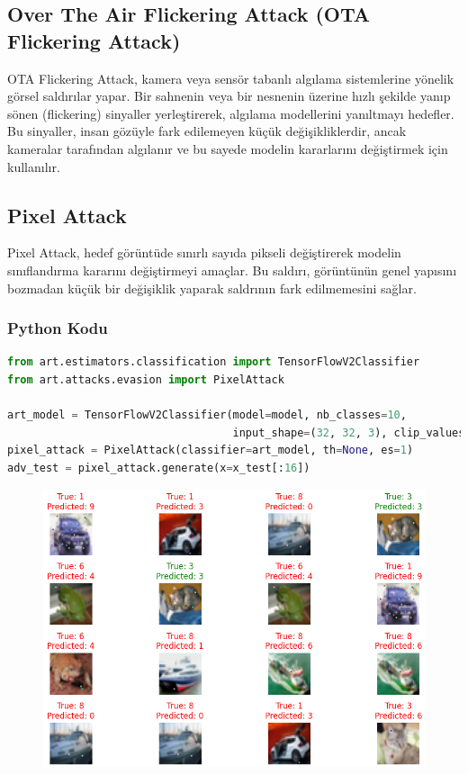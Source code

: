 \newpage

\subsection{Over The Air Flickering Attack (OTA Flickering Attack)}

OTA Flickering Attack, kamera veya sensör tabanlı algılama sistemlerine yönelik görsel saldırılar yapar. Bir sahnenin veya bir nesnenin üzerine hızlı şekilde yanıp sönen (flickering) sinyaller yerleştirerek, algılama modellerini yanıltmayı hedefler. Bu sinyaller, insan gözüyle fark edilemeyen küçük değişikliklerdir, ancak kameralar tarafından algılanır ve bu sayede modelin kararlarını değiştirmek için kullanılır.

\newpage

\subsection{Pixel Attack}

Pixel Attack, hedef görüntüde sınırlı sayıda pikseli değiştirerek modelin sınıflandırma kararını değiştirmeyi amaçlar. Bu saldırı, görüntünün genel yapısını bozmadan küçük bir değişiklik yaparak saldrının fark edilmemesini sağlar.

\subsubsection{Python Kodu}

\begin{lstlisting}[language=Python]
from art.estimators.classification import TensorFlowV2Classifier
from art.attacks.evasion import PixelAttack

art_model = TensorFlowV2Classifier(model=model, nb_classes=10, 
                                   input_shape=(32, 32, 3), clip_values=(0, 1))
pixel_attack = PixelAttack(classifier=art_model, th=None, es=1)
adv_test = pixel_attack.generate(x=x_test[:16])
\end{lstlisting}

\begin{figure}[h]
    \centering
    \includegraphics[width=1\textwidth]{images/pixel_attack_results.png}
    \caption{}
\end{figure}

